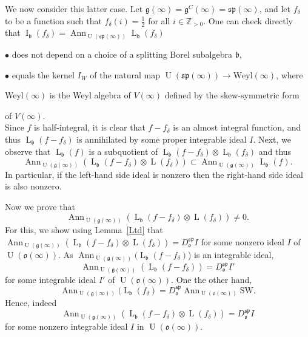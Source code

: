 \documentclass{emsprocart}
\begin{document}
We now consider this latter case. Let $\mathfrak g(\infty)=\mathfrak g^C(\infty)=\mathfrak{sp}(\infty)$, and let $f_{\delta}$ to be a function such that $f_\delta(i)=\frac12$ for all $i\in\mathbb Z_{>0}$. One can check directly that $\operatorname{I}_\mathfrak b(f_\delta)=\operatorname{Ann}_{\operatorname{U}(\mathfrak{sp}(\infty))}\operatorname{L}_\mathfrak b(f_\delta)$

$\bullet$ does not depend on a choice of a splitting Borel subalgebra $\mathfrak b$,

$\bullet$ equals the kernel $I_W$ of the natural map $\operatorname{U}(\mathfrak{sp}(\infty))\to \mbox{Weyl}(\infty)$, where

Weyl$(\infty)$ is the Weyl algebra of $V(\infty)$ defined by the skew-symmetric form

of $V(\infty)$.\\
Since $f$ is half-integral, it is clear that $f-f_{\delta}$ is an almost integral function, and thus $\operatorname{L}_\mathfrak b(f-f_\delta)$ is annihilated by some proper integrable ideal $I$. Next, we observe that $\operatorname{L}_\mathfrak b(f)$ is a subquotient of $\operatorname{L}_\mathfrak b(f-f_\delta)\otimes \operatorname{L}_\mathfrak b(f_\delta)$ and thus
$$\operatorname{Ann}_{\operatorname{U}(\mathfrak g(\infty))} (\operatorname{L}_\mathfrak b(f-f_\delta)\otimes \operatorname{L}(f_\delta))\subset \operatorname{Ann}_{\operatorname{U}(\mathfrak g(\infty))} \operatorname{L}_\mathfrak b(f).$$In particular, if the left-hand side ideal is nonzero then the right-hand side ideal is also nonzero.

Now we prove that $$\operatorname{Ann}_{\operatorname{U}(\mathfrak g(\infty))} (\operatorname{L}_\mathfrak b(f-f_\delta)\otimes \operatorname{L}(f_\delta))\ne 0.$$
For this, we show  using Lemma~\ref{Ltd} 
that $\operatorname{Ann}_{\operatorname{U}(\mathfrak g(\infty))} (\operatorname{L}_\mathfrak b(f-f_\delta)\otimes \operatorname{L}(f_\delta))=D_\mathfrak o^\mathfrak{sp}I$ for some nonzero ideal $I$ of $\operatorname{U}(\mathfrak o(\infty))$. As $\operatorname{Ann}_{\operatorname{U}(\mathfrak g(\infty))} (\operatorname{L}_\mathfrak b(f-f_\delta)$) is an integrable ideal,
$$\operatorname{Ann}_{\operatorname{U}(\mathfrak g(\infty))} (\operatorname{L}_\mathfrak b(f-f_\delta))=D_\mathfrak o^\mathfrak{sp}I'$$for some integrable ideal $I'$ of $\operatorname{U}(\mathfrak o(\infty))$. One the other hand,$$\operatorname{Ann}_{\operatorname{U}(\mathfrak g(\infty))} (\operatorname{L}_\mathfrak b(f_\delta)=D_\mathfrak o^{\mathfrak{sp}}\operatorname{Ann}_{\operatorname{U}(\mathfrak o(\infty))} \mbox{SW}.$$ Hence, indeed $$\operatorname{Ann}_{\operatorname{U}(\mathfrak g(\infty))} (\operatorname{L}_\mathfrak b(f-f_\delta)\otimes \operatorname{L}(f_\delta))=D_\mathfrak o^{\mathfrak{sp}}I$$for some nonzero integrable ideal $I$ in $\operatorname{U}(\mathfrak o(\infty))$.
\end{document}
